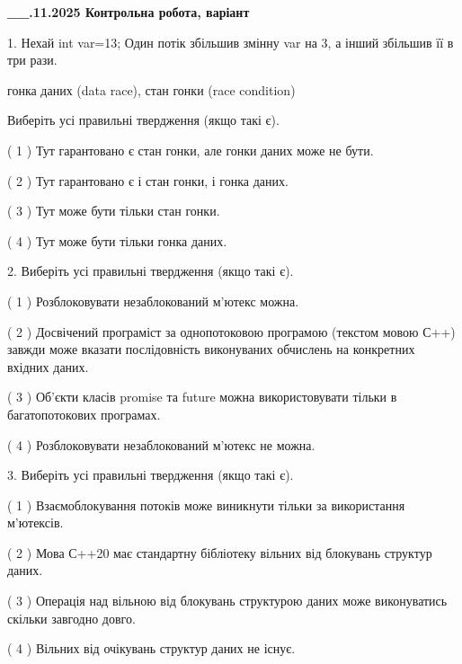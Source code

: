 \documentclass[12pt, ukrainian]{article}
\begin{document}
\newpage
\begin {large}

\textbf{\_\_.11.2025 Контрольна робота, варіант  }\par


{
1. Нехай int var=13; Один потік збільшив змінну var на 3, а інший збільшив її в три рази.

гонка даних (data race), стан гонки (race condition)

Виберіть усі правильні твердження (якщо такі є).\par
\vspace{2mm}
( 1 ) Тут гарантовано є стан гонки, але гонки даних може не бути.%

( 2 ) Тут гарантовано є і стан гонки, і гонка даних.%

( 3 ) Тут може бути тільки стан гонки.%

( 4 ) Тут може бути тільки гонка даних.%


2. Виберіть усі правильні твердження (якщо такі є).\par
\vspace{2mm}

( 1 ) Розблоковувати незаблокований м’ютекс можна.%

( 2 ) Досвічений програміст за однопотоковою програмою (текстом мовою С++) завжди може вказати послідовність виконуваних обчислень на конкретних вхідних даних.%

( 3 ) Об’єкти класів promise та future можна використовувати тільки в багатопотокових програмах.%

( 4 ) Розблоковувати незаблокований м’ютекс не можна.%


3. Виберіть усі правильні твердження (якщо такі є).\par
\vspace{2mm}

( 1 ) Взаємоблокування потоків може виникнути тільки за використання м’ютексів.%

( 2 ) Мова С++20 має стандартну бібліотеку вільних від блокувань структур даних.%

( 3 ) Операція над вільною від блокувань структурою даних може виконуватись скільки завгодно довго.%

( 4 ) Вільних від очікувань структур даних не існує.%


}
\end{large}
\end{document}
